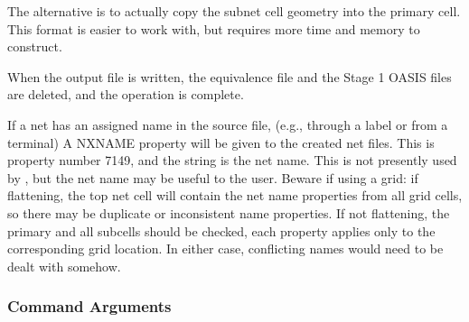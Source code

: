 The alternative is to actually copy the subnet cell geometry into the
primary cell.  This format is easier to work with, but requires more
time and memory to construct.

When the output file is written, the equivalence file and the Stage 1
OASIS files are deleted, and the operation is complete.

If a net has an assigned name in the source file, (e.g., through a
label or from a terminal) A NXNAME property will be given to the
created net files.  This is property number 7149, and the string is
the net name.  This is not presently used by {\Xic}, but the net name
may be useful to the user.  Beware if using a grid:  if flattening,
the top net cell will contain the net name properties from all grid
cells, so there may be duplicate or inconsistent name properties.  If
not flattening, the primary and all subcells should be checked, each
property applies only to the corresponding grid location.  In either
case, conflicting names would need to be dealt with somehow.

\subsubsection{Command Arguments}

